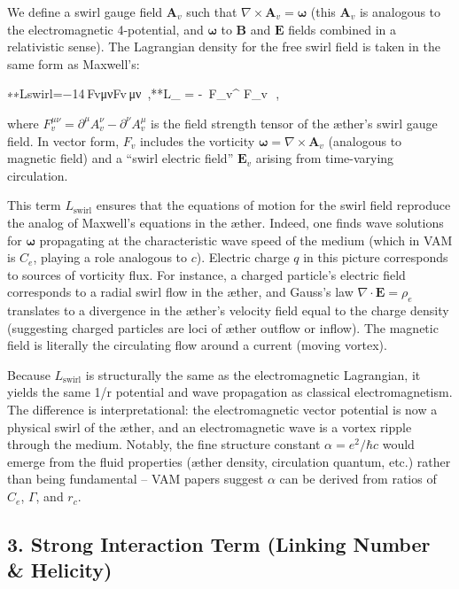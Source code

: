 We define a swirl gauge field $\mathbf{A}_v$ such that $\nabla \times \mathbf{A}_v = \mathbf{\omega}$ (this $\mathbf{A}_v$ is analogous to the electromagnetic 4-potential, and $\mathbf{\omega}$ to $\mathbf{B}$ and $\mathbf{E}$ fields combined in a relativistic sense). The Lagrangian density for the free swirl field is taken in the same form as Maxwell’s:

∗∗Lswirl=−14 FvμνFv μν ,**L_{} = -\, F_{v}^{\mu\nu} F_{v\,\mu\nu}~,

where $F_v^{\mu\nu} = \partial^\mu A_v^{\nu} - \partial^\nu A_v^{\mu}$ is the field strength tensor of the æther’s swirl gauge field. In vector form, $F_v$ includes the vorticity $\mathbf{\omega} = \nabla \times \mathbf{A}_v$ (analogous to magnetic field) and a “swirl electric field” $\mathbf{E}_v$ arising from time-varying circulation.


This term $L_{\text{swirl}}$ ensures that the equations of motion for the swirl field reproduce the analog of Maxwell’s equations in the æther. Indeed, one finds wave solutions for $\mathbf{\omega}$ propagating at the characteristic wave speed of the medium (which in VAM is $C_e$, playing a role analogous to $c$). Electric charge $q$ in this picture corresponds to sources of vorticity flux. For instance, a charged particle’s electric field corresponds to a radial swirl flow in the æther, and Gauss’s law $\nabla\cdot \mathbf{E} = \rho_e$ translates to a divergence in the æther’s velocity field equal to the charge density (suggesting charged particles are loci of æther outflow or inflow). The magnetic field is literally the circulating flow around a current (moving vortex).


Because $L_{\text{swirl}}$ is structurally the same as the electromagnetic Lagrangian, it yields the same 1/r potential and wave propagation as classical electromagnetism. The difference is interpretational: the electromagnetic vector potential is now a physical swirl of the æther, and an electromagnetic wave is a vortex ripple through the medium. Notably, the fine structure constant $\alpha = e^2/\hbar c$ would emerge from the fluid properties (æther density, circulation quantum, etc.) rather than being fundamental – VAM papers suggest $\alpha$ can be derived from ratios of $C_e$, $\Gamma$, and $r_c$.


\subsection*{3. Strong Interaction Term (Linking Number & Helicity)}

